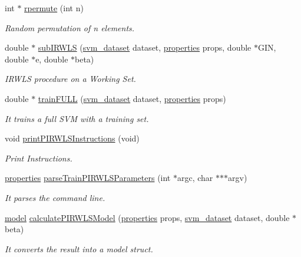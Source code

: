 \begin{DoxyCompactItemize}
\item 
int $\ast$ \hyperlink{PIRWLS-train_8h_a9e75aabe599f48c66cbda89320d68a71}{rpermute} (int n)
\begin{DoxyCompactList}\small\item\em Random permutation of n elements. \end{DoxyCompactList}\item 
double $\ast$ \hyperlink{PIRWLS-train_8h_af736cb71af5e7e4cb062977793905f4d}{sub\+I\+R\+W\+LS} (\hyperlink{structsvm__dataset}{svm\+\_\+dataset} dataset, \hyperlink{structproperties}{properties} props, double $\ast$G\+IN, double $\ast$e, double $\ast$beta)
\begin{DoxyCompactList}\small\item\em I\+R\+W\+LS procedure on a Working Set. \end{DoxyCompactList}\item 
double $\ast$ \hyperlink{PIRWLS-train_8h_ad719770a7de382211555ba831af2ea28}{train\+F\+U\+LL} (\hyperlink{structsvm__dataset}{svm\+\_\+dataset} dataset, \hyperlink{structproperties}{properties} props)
\begin{DoxyCompactList}\small\item\em It trains a full S\+VM with a training set. \end{DoxyCompactList}\item 
void \hyperlink{PIRWLS-train_8h_ad1ed66cb2f4848a8a865bfcca4e86e91}{print\+P\+I\+R\+W\+L\+S\+Instructions} (void)
\begin{DoxyCompactList}\small\item\em Print Instructions. \end{DoxyCompactList}\item 
\hyperlink{structproperties}{properties} \hyperlink{PIRWLS-train_8h_a661bbe4aa2899bb306b7b509296068a2}{parse\+Train\+P\+I\+R\+W\+L\+S\+Parameters} (int $\ast$argc, char $\ast$$\ast$$\ast$argv)
\begin{DoxyCompactList}\small\item\em It parses the command line. \end{DoxyCompactList}\item 
\hyperlink{structmodel}{model} \hyperlink{PIRWLS-train_8h_aeaa2f3c1d0f757826017dae7a83d7f8a}{calculate\+P\+I\+R\+W\+L\+S\+Model} (\hyperlink{structproperties}{properties} props, \hyperlink{structsvm__dataset}{svm\+\_\+dataset} dataset, double $\ast$beta)
\begin{DoxyCompactList}\small\item\em It converts the result into a model struct. \end{DoxyCompactList}\end{DoxyCompactItemize}


